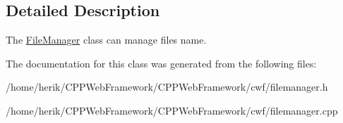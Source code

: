 \subsection{Detailed Description}
The \hyperlink{class_file_manager}{File\+Manager} class can manage file\textquotesingle{}s name. 

The documentation for this class was generated from the following files\+:\begin{DoxyCompactItemize}
\item 
/home/herik/\+C\+P\+P\+Web\+Framework/\+C\+P\+P\+Web\+Framework/cwf/filemanager.\+h\item 
/home/herik/\+C\+P\+P\+Web\+Framework/\+C\+P\+P\+Web\+Framework/cwf/filemanager.\+cpp\end{DoxyCompactItemize}
